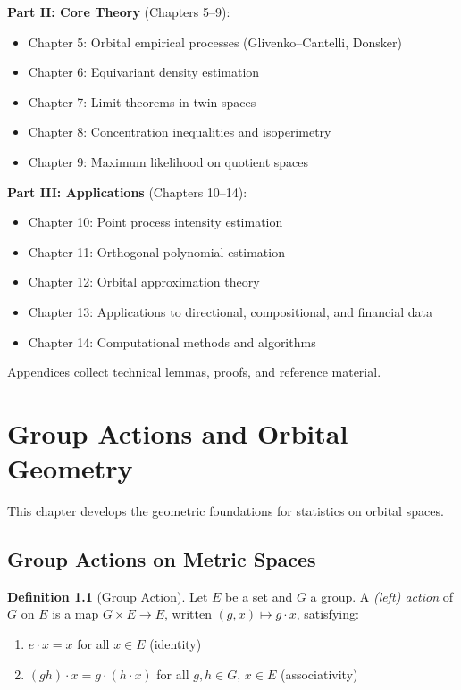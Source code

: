 \documentclass[11pt,twoside,openright]{book}
\theoremstyle{plain}
\theoremstyle{definition}
\newtheorem{definition}[theorem]{Definition}
\theoremstyle{remark}
\begin{document}
\textbf{Part II: Core Theory} (Chapters 5--9):
\begin{itemize}
\item Chapter 5: Orbital empirical processes (Glivenko--Cantelli, Donsker)
\item Chapter 6: Equivariant density estimation
\item Chapter 7: Limit theorems in twin spaces
\item Chapter 8: Concentration inequalities and isoperimetry
\item Chapter 9: Maximum likelihood on quotient spaces
\end{itemize}

\textbf{Part III: Applications} (Chapters 10--14):
\begin{itemize}
\item Chapter 10: Point process intensity estimation
\item Chapter 11: Orthogonal polynomial estimation
\item Chapter 12: Orbital approximation theory
\item Chapter 13: Applications to directional, compositional, and financial data
\item Chapter 14: Computational methods and algorithms
\end{itemize}

Appendices collect technical lemmas, proofs, and reference material.


\chapter{Group Actions and Orbital Geometry}
\label{ch:orbital-geometry}

This chapter develops the geometric foundations for statistics on orbital spaces.

\section{Group Actions on Metric Spaces}

\begin{definition}[Group Action]
Let $E$ be a set and $G$ a group. A \emph{(left) action} of $G$ on $E$ is a map $G \times E \to E$, written $(g, x) \mapsto g \cdot x$, satisfying:
\begin{enumerate}[label=(\roman*)]
\item $e \cdot x = x$ for all $x \in E$ (identity)
\item $(gh) \cdot x = g \cdot (h \cdot x)$ for all $g, h \in G$, $x \in E$ (associativity)
\end{enumerate}
\end{definition}
\end{document}
